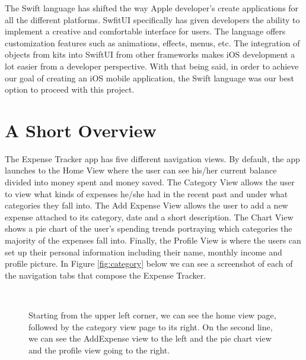 \documentclass{article}
\begin{document}
  The Swift language has shifted the way Apple developer’s create applications for all the different platforms. SwfitUI specifically has given developers the ability to implement a creative and comfortable interface for users. The language offers customization features such as animations, effects, menus, etc. The integration of objects from kits into SwiftUI from other frameworks makes iOS development a lot easier from a developer perspective. With that being said, in order to achieve our goal of creating an iOS mobile application, the Swift language was our best option to proceed with this project. 

  
\section{A Short Overview}
The Expense Tracker app has five different navigation views. By default, the app launches to the Home View where the user can see his/her current balance divided into money spent and money saved. The Category View allows the user to view what kinds of expenses he/she had in the recent past and under what categories they fall into. The Add Expense View allows the user to add a new expense attached to its category, date and a short description. The Chart View shows a pie chart of the user's spending trends portraying which categories the majority of the expenses fall into. Finally, the Profile View is where the users can set up their personal information including their name, monthly income and profile picture. 
 In Figure \ref{fig:category} below we can see a screenshot of each of the navigation tabs that compose the Expense Tracker.


\begin{figure}[H]
\\[0.5cm]%
%
\caption{Starting from the upper left corner, we can see the home view page, followed by the category view page to its right. On the second line, we can see the AddExpense view to the left and the pie chart view and the profile view going to the right.}
\label{fig:OlimpicCircleTT1}
\end{figure}
\end{document}
